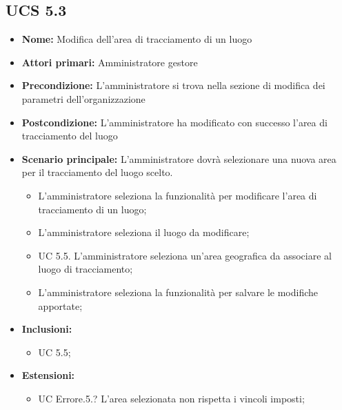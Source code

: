 \subsection{UCS 5.3}%
\begin{itemize}
    \item \textbf{Nome:} Modifica dell'area di tracciamento di un luogo
    \item \textbf{Attori primari:} Amministratore gestore
    \item \textbf{Precondizione:} L'amministratore si trova nella sezione di modifica dei parametri dell'organizzazione
    \item \textbf{Postcondizione:} L'amministratore ha modificato con successo l'area di tracciamento del luogo
    \item \textbf{Scenario principale:} L'amministratore dovrà selezionare una nuova area per il tracciamento del luogo scelto.
    \begin{itemize}%
        \item L'amministratore seleziona la funzionalità per modificare l'area di tracciamento di un luogo;
        \item L'amministratore seleziona il luogo da modificare;
        \item UC 5.5. L'amministratore seleziona un'area geografica da associare al luogo di tracciamento;
        \item L'amministratore seleziona la funzionalità per salvare le modifiche apportate;
    \end{itemize}
    \item \textbf{Inclusioni:}
    \begin{itemize}
        \item UC 5.5;
    \end{itemize}
    \item \textbf{Estensioni:}
    \begin{itemize}
        \item UC Errore.5.? L'area selezionata non rispetta i vincoli imposti;
    \end{itemize}
\end{itemize}

